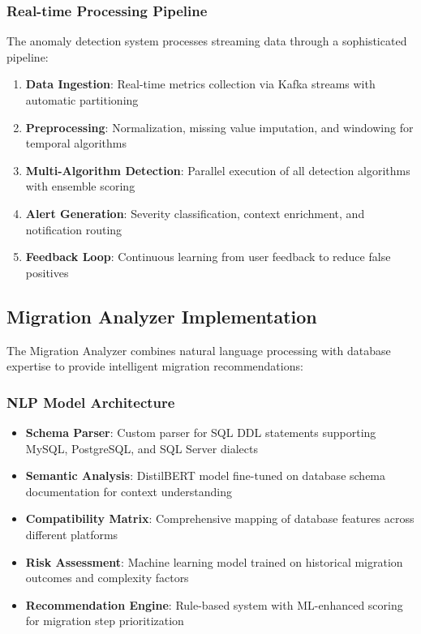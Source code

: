 \subsubsection{Real-time Processing Pipeline}

The anomaly detection system processes streaming data through a sophisticated pipeline:

\begin{enumerate}[leftmargin=*]
    \item \textbf{Data Ingestion}: Real-time metrics collection via Kafka streams with automatic partitioning
    \item \textbf{Preprocessing}: Normalization, missing value imputation, and windowing for temporal algorithms
    \item \textbf{Multi-Algorithm Detection}: Parallel execution of all detection algorithms with ensemble scoring
    \item \textbf{Alert Generation}: Severity classification, context enrichment, and notification routing
    \item \textbf{Feedback Loop}: Continuous learning from user feedback to reduce false positives
\end{enumerate}

\subsection{Migration Analyzer Implementation}

The Migration Analyzer combines natural language processing with database expertise to provide intelligent migration recommendations:

\subsubsection{NLP Model Architecture}

\begin{itemize}
    \item \textbf{Schema Parser}: Custom parser for SQL DDL statements supporting MySQL, PostgreSQL, and SQL Server dialects
    \item \textbf{Semantic Analysis}: DistilBERT model fine-tuned on database schema documentation for context understanding
    \item \textbf{Compatibility Matrix}: Comprehensive mapping of database features across different platforms
    \item \textbf{Risk Assessment}: Machine learning model trained on historical migration outcomes and complexity factors
    \item \textbf{Recommendation Engine}: Rule-based system with ML-enhanced scoring for migration step prioritization
\end{itemize}


